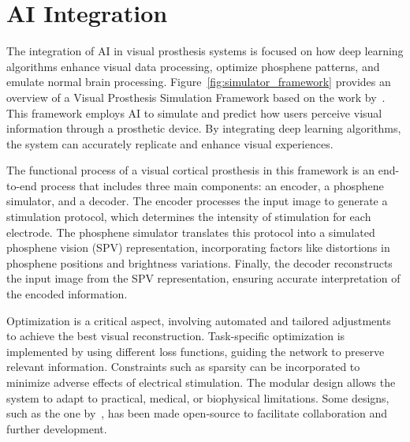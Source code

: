 \documentclass[twocolumn,10pt]{article}
\begin{document}
\section*{AI Integration}\label{sec:ai_integration}
The integration of AI in visual prosthesis systems is focused on how deep
learning algorithms enhance visual data processing, optimize phosphene patterns,
and emulate normal brain processing. Figure~\ref{fig:simulator_framework}
provides an overview of a Visual Prosthesis Simulation Framework based on the
work by~\textcite{deruytervansteveninckEndtoendOptimizationProsthetic2022}. This
framework employs AI to simulate and predict how users perceive visual
information through a prosthetic device. By integrating deep learning
algorithms, the system can accurately replicate and enhance visual experiences.

The functional process of a visual cortical prosthesis in this framework is an
end-to-end process that includes three main components: an encoder, a phosphene
simulator, and a decoder. The encoder processes the input image to generate a
stimulation protocol, which determines the intensity of stimulation for each
electrode. The phosphene simulator translates this protocol into a simulated
phosphene vision (SPV) representation, incorporating factors like distortions in
phosphene positions and brightness variations. Finally, the decoder reconstructs
the input image from the SPV representation, ensuring accurate interpretation of
the encoded information.

Optimization is a critical aspect, involving automated and tailored adjustments
to achieve the best visual reconstruction. Task-specific optimization is
implemented by using different loss functions, guiding the network to preserve
relevant information. Constraints such as sparsity can be incorporated to
minimize adverse effects of electrical stimulation. The modular design allows
the system to adapt to practical, medical, or biophysical limitations. Some
designs, such as the one
by~\textcite{deruytervansteveninckEndtoendOptimizationProsthetic2022}, has been
made open-source to facilitate collaboration and further development.
\end{document}
